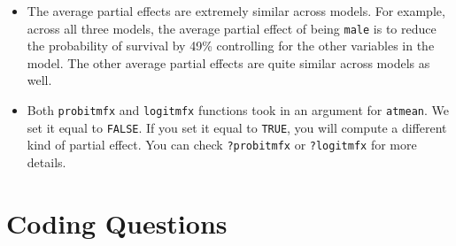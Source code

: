 \documentclass[
  letterpaper,
  DIV=11,
  numbers=noendperiod]{scrreprt}
\begin{document}
\begin{itemize}
\item
  The average partial effects are extremely similar across models. For
  example, across all three models, the average partial effect of being
  \texttt{male} is to reduce the probability of survival by 49\%
  controlling for the other variables in the model. The other average
  partial effects are quite similar across models as well.
\item
  Both \texttt{probitmfx} and \texttt{logitmfx} functions took in an
  argument for \texttt{atmean}. We set it equal to \texttt{FALSE}. If
  you set it equal to \texttt{TRUE}, you will compute a different kind
  of partial effect. You can check \texttt{?probitmfx} or
  \texttt{?logitmfx} for more details.
\end{itemize}

\section{Coding Questions}\label{coding-questions-3}
\end{document}
